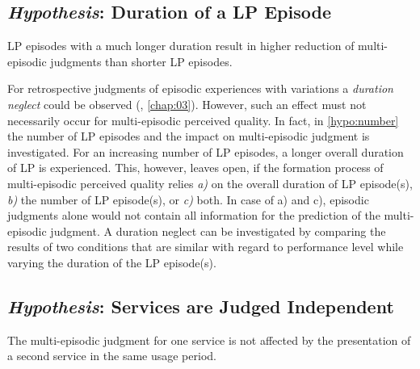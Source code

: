 \subsection[H6: Duration of a \acs{LP} Episode]{\emph{Hypothesis}: Duration of a \acs{LP} Episode}
\begin{hypothesis}\label{hypo:duration}
\ac{LP} episodes with a much longer duration result in higher reduction of multi-episodic judgments than shorter \ac{LP} episodes.
\end{hypothesis}

For retrospective judgments of episodic experiences with variations a \emph{duration neglect} could be observed (\cf, \autoref{chap:03}).
However, such an effect must not necessarily occur for multi-episodic perceived quality.
In fact, in \autoref{hypo:number} the number of \ac{LP} episodes and the impact on multi-episodic judgment is investigated.
For an increasing number of \ac{LP} episodes, a longer overall duration of \ac{LP} is experienced.
This, however, leaves open, if the formation process of multi-episodic perceived quality relies \emph{a)} on the overall duration of \ac{LP} episode(s), \emph{b)} the number of \ac{LP} episode(s), or \emph{c)} both.
In case of a) and c), episodic judgments alone would not contain all information for the prediction of the multi-episodic judgment.
A duration neglect can be investigated by comparing the results of two conditions that are similar with regard to performance level while varying the duration of the \ac{LP} episode(s).

\subsection[H7: Services are Judged Independent]{\emph{Hypothesis}: Services are Judged Independent}
\begin{hypothesis}\label{hypo:independent}
The multi-episodic judgment for one service is not affected by the presentation of a second service in the same usage period.
\end{hypothesis}

